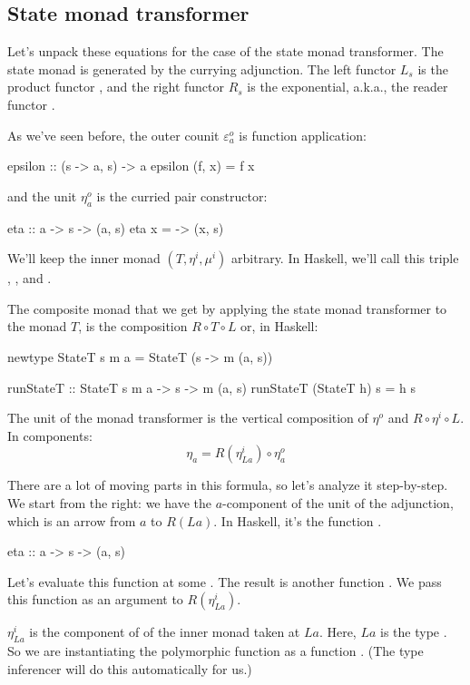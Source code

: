 \documentclass[DaoFP]{subfiles}
\begin{document}
\subsection{State monad transformer}

Let's unpack these equations for the case of the state monad transformer. The state monad is generated by the currying adjunction. The left functor $L_s$ is the product functor , and the right functor $R_s$ is the exponential, a.k.a., the reader functor . 

As we've seen before, the outer counit $\varepsilon^o_a$ is function application:
\begin{haskell}
epsilon :: (s -> a, s) -> a
epsilon (f, x) = f x
\end{haskell}
and the unit $\eta^o_a$ is the curried pair constructor:
\begin{haskell}
eta :: a -> s -> (a, s)
eta x = \s -> (x, s)
\end{haskell}


We'll keep the inner monad $(T, \eta^i, \mu^i)$ arbitrary. In Haskell, we'll call this triple , , and .

The composite monad that we get by applying the state monad transformer to the monad $T$, is the composition $R \circ T \circ L$ or, in Haskell:
\begin{haskell}
newtype StateT s m a = StateT (s -> m (a, s))
\end{haskell}

\begin{haskell}
runStateT :: StateT s m a -> s -> m (a, s)
runStateT (StateT h) s = h s
\end{haskell}

The unit of the monad transformer is the vertical composition of $\eta^o$ and $R \circ \eta^i \circ L$. In components:
\[ \eta_a = R(\eta^i_{L a}) \circ \eta^o_a \]

There are a lot of moving parts in this formula, so let's analyze it step-by-step. We start from the right: we have the $a$-component of the unit of the adjunction, which is an arrow from $a$ to $R (L a)$. In Haskell, it's the function . 
\begin{haskell}
eta :: a -> s -> (a, s)
\end{haskell}
Let's evaluate this function at some . The result is another function . We pass this function as an argument to $R(\eta^i_{L a})$. 

$\eta^i_{L a}$ is the component of  of the inner monad taken at $L a$. Here, $L a$ is the type . So we are instantiating the polymorphic function  as a function . (The type inferencer will do this automatically for us.)
\end{document}
